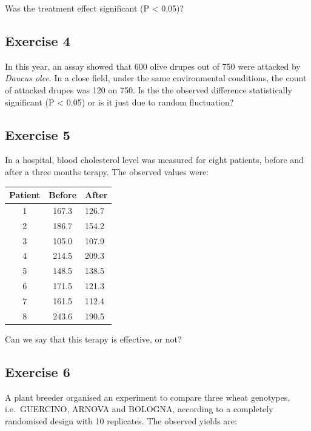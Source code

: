 \documentclass[a4paper,12pt,oneside]{book}
\begin{document}
Was the treatment effect significant (P \textless{} 0.05)?

\hypertarget{exercise-4-2}{%
\subsection{Exercise 4}\label{exercise-4-2}}

In this year, an assay showed that 600 olive drupes out of 750 were attacked by \emph{Daucus olee}. In a close field, under the same environmental conditions, the count of attacked drupes was 120 on 750. Is the the observed difference statistically significant (P \textless{} 0.05) or is it just due to random fluctuation?

\hypertarget{exercise-5-1}{%
\subsection{Exercise 5}\label{exercise-5-1}}

In a hospital, blood cholesterol level was measured for eight patients, before and after a three months terapy. The observed values were:

\begin{longtable}[]{@{}ccl@{}}
\toprule
Patient & Before & After \\
\midrule
\endhead
1 & 167.3 & 126.7 \\
2 & 186.7 & 154.2 \\
3 & 105.0 & 107.9 \\
4 & 214.5 & 209.3 \\
5 & 148.5 & 138.5 \\
6 & 171.5 & 121.3 \\
7 & 161.5 & 112.4 \\
8 & 243.6 & 190.5 \\
\bottomrule
\end{longtable}

Can we say that this terapy is effective, or not?

\hypertarget{exercise-6-1}{%
\subsection{Exercise 6}\label{exercise-6-1}}

A plant breeder organised an experiment to compare three wheat genotypes, i.e.~GUERCINO, ARNOVA and BOLOGNA, according to a completely randomised design with 10 replicates. The observed yields are:
\end{document}

